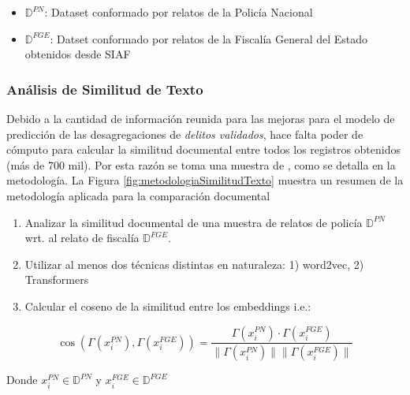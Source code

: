 \documentclass[onecolumn, journal, english, 12pt, a4paper]{IEEEtran} %
\theoremstyle{definition}
\begin{document}
\begin{itemize}
      \item $\mathbb{D}^{PN}$: Dataset conformado por relatos de la Policía Nacional

      \item $\mathbb{D}^{FGE}$: Datset conformado por relatos de la
      Fiscalía General del Estado obtenidos desde SIAF
 \end{itemize}

\subsubsection{Análisis de Similitud de Texto}
Debido a la cantidad de información reunida para las mejoras para el
modelo de predicción de las desagregaciones de \emph{delitos
  validados}, hace falta poder de cómputo para calcular la similitud
documental entre todos los registros obtenidos (más de 700 mil). Por
esta razón se toma una muestra de , como se detalla en
la metodología. La Figura \ref{fig:metodologiaSimilitudTexto} muestra
un resumen de la metodología aplicada para la comparación documental

\begin{enumerate}
\item Analizar la similitud documental de una muestra de relatos de
  policía $\mathbb{D}^{PN}$ wrt. al relato de fiscalía
  $\mathbb{D}^{FGE}$.
\item Utilizar al menos dos técnicas distintas en naturaleza: 1)
  word2vec, 2) Transformers
\item Calcular el coseno de la similitud entre los embeddings i.e.:
       
\end{enumerate}

\begin{equation}\label{eq:cosinesimilarity}         
        \cos(\Gamma(x_i^{PN}), \Gamma(x_i^{FGE})) = \frac{\Gamma(x_i^{PN})\cdot\Gamma(x_i^{FGE})}{\lVert \Gamma(x_i^{PN}) \rVert\lVert \Gamma(x_i^{FGE}) \rVert}
\end{equation}

Donde $x_i^{PN} \in \mathbb{D}^{PN}$ y $x_i^{FGE} \in \mathbb{D}^{FGE}$
\end{document}
